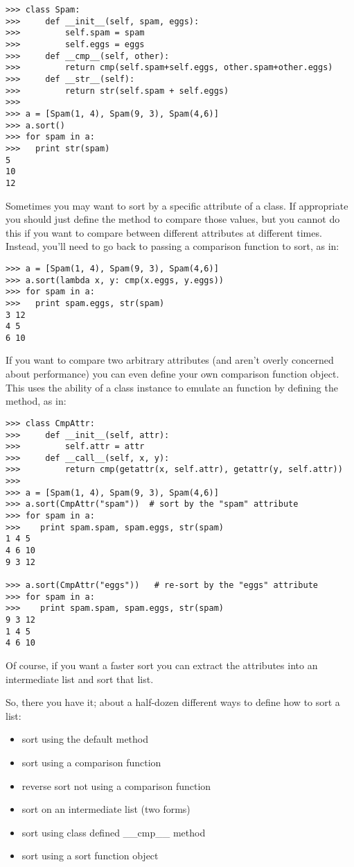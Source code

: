 \documentclass{howto}
\begin{document}
\begin{verbatim}
>>> class Spam:
>>>     def __init__(self, spam, eggs):
>>>         self.spam = spam
>>>         self.eggs = eggs
>>>     def __cmp__(self, other):
>>>         return cmp(self.spam+self.eggs, other.spam+other.eggs)
>>>     def __str__(self):
>>>         return str(self.spam + self.eggs)
>>> 
>>> a = [Spam(1, 4), Spam(9, 3), Spam(4,6)]
>>> a.sort()
>>> for spam in a:
>>>   print str(spam)
5
10
12
\end{verbatim}

Sometimes you may want to sort by a specific attribute of a class.  If
appropriate you should just define the  method to compare
those values, but you cannot do this if you want to compare between
different attributes at different times.  Instead, you'll need to go
back to passing a comparison function to sort, as in:

\begin{verbatim}
>>> a = [Spam(1, 4), Spam(9, 3), Spam(4,6)]
>>> a.sort(lambda x, y: cmp(x.eggs, y.eggs))
>>> for spam in a:
>>>   print spam.eggs, str(spam)
3 12
4 5
6 10
\end{verbatim}

If you want to compare two arbitrary attributes (and aren't overly
concerned about performance) you can even define your own comparison
function object.  This uses the ability of a class instance to emulate
an function by defining the  method, as in:

\begin{verbatim}
>>> class CmpAttr:
>>>     def __init__(self, attr):
>>>         self.attr = attr
>>>     def __call__(self, x, y):
>>>         return cmp(getattr(x, self.attr), getattr(y, self.attr))
>>> 
>>> a = [Spam(1, 4), Spam(9, 3), Spam(4,6)]
>>> a.sort(CmpAttr("spam"))  # sort by the "spam" attribute
>>> for spam in a:
>>>    print spam.spam, spam.eggs, str(spam)
1 4 5
4 6 10
9 3 12

>>> a.sort(CmpAttr("eggs"))   # re-sort by the "eggs" attribute
>>> for spam in a:
>>>    print spam.spam, spam.eggs, str(spam)
9 3 12
1 4 5
4 6 10
\end{verbatim}

Of course, if you want a faster sort you can extract the attributes
into an intermediate list and sort that list.


So, there you have it; about a half-dozen different ways to define how
to sort a list:
\begin{itemize}
 \item sort using the default method
 \item sort using a comparison function
 \item reverse sort not using a comparison function
 \item sort on an intermediate list (two forms)
 \item sort using class defined __cmp__ method
 \item sort using a sort function object
\end{itemize}
\end{document}
